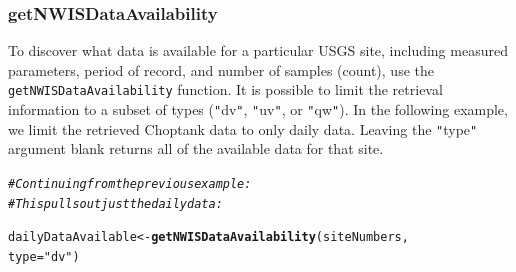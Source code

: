 \documentclass[a4paper,11pt]{article}\usepackage[]{graphicx}\usepackage[]{color}
\makeatletter
\newcommand{\hlstr}[1]{\textcolor[rgb]{0.192,0.494,0.8}{#1}}%
\newcommand{\hlcom}[1]{\textcolor[rgb]{0.678,0.584,0.686}{\textit{#1}}}%
\newcommand{\hlstd}[1]{\textcolor[rgb]{0.345,0.345,0.345}{#1}}%
\newcommand{\hlkwb}[1]{\textcolor[rgb]{0.69,0.353,0.396}{#1}}%
\newcommand{\hlkwc}[1]{\textcolor[rgb]{0.333,0.667,0.333}{#1}}%
\newcommand{\hlkwd}[1]{\textcolor[rgb]{0.737,0.353,0.396}{\textbf{#1}}}%
\newenvironment{kframe}{%
 \def\at@end@of@kframe{}%
 \ifinner\ifhmode%
  \def\at@end@of@kframe{\end{minipage}}%
  \begin{minipage}{\columnwidth}%
 \fi\fi%
 \def\FrameCommand##1{\hskip\@totalleftmargin \hskip-\fboxsep
 \colorbox{shadecolor}{##1}\hskip-\fboxsep
     \hskip-\linewidth \hskip-\@totalleftmargin \hskip\columnwidth}%
 \MakeFramed {\advance\hsize-\width
   \@totalleftmargin\z@ \linewidth\hsize
   \@setminipage}}%
 {\par\unskip\endMakeFramed%
 \at@end@of@kframe}
\newenvironment{knitrout}{}{} %
\makeatother
\begin{document}
\subsubsection{getNWISDataAvailability}
\label{sec:usgsDataAvailability}
To discover what data is available for a particular USGS site, including measured parameters, period of record, and number of samples (count), use the \texttt{getNWISDataAvailability} function. It is possible to limit the retrieval information to a subset of types (\texttt{"}dv\texttt{"}, \texttt{"}uv\texttt{"}, or \texttt{"}qw\texttt{"}). In the following example, we limit the retrieved Choptank data to only daily data. Leaving the \texttt{"}type\texttt{"} argument blank returns all of the available data for that site.


\begin{knitrout}
\color{fgcolor}\begin{kframe}
\begin{alltt}
\hlcom{# Continuing from the previous example:}
\hlcom{# This pulls out just the daily data:}

\hlstd{dailyDataAvailable} \hlkwb{<-} \hlkwd{getNWISDataAvailability}\hlstd{(siteNumbers,}
                    \hlkwc{type}\hlstd{=}\hlstr{"dv"}\hlstd{)}
\end{alltt}
\end{kframe}
\end{knitrout}
\end{document}
